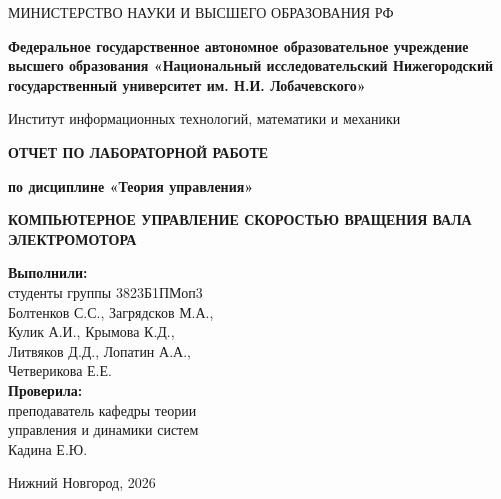 \documentclass[12pt,a4paper]{extarticle}
\begin{document}
\begin{titlepage}
    \begin{center}
        \small
        МИНИСТЕРСТВО НАУКИ И ВЫСШЕГО ОБРАЗОВАНИЯ РФ
        \vspace{0.3cm}
        
        \textbf{Федеральное государственное автономное образовательное учреждение высшего образования «Национальный исследовательский
        Нижегородский государственный университет им. Н.И. Лобачевского»}
        \vspace{0.3cm}
        
        Институт информационных технологий, математики и механики
        \vspace{2cm}
        
        \large\textbf{ОТЧЕТ ПО ЛАБОРАТОРНОЙ РАБОТЕ}
        \vspace{0.3cm}
        
        \large\textbf{по дисциплине «Теория управления»}
        \vspace{1cm}
        
        \large\textbf{КОМПЬЮТЕРНОЕ УПРАВЛЕНИЕ СКОРОСТЬЮ ВРАЩЕНИЯ ВАЛА ЭЛЕКТРОМОТОРА}
        \vspace{2cm}
    \end{center}
    
    \begin{flushright}
        \hspace*{3cm}
        \begin{minipage}{0.45\textwidth}
            \textbf{Выполнили:}\\
            студенты группы 3823Б1ПМоп3\\
            Болтенков С.С., Загрядсков М.А.,\\
            Кулик А.И., Крымова К.Д.,\\
            Литвяков Д.Д., Лопатин А.А.,\\
            Четверикова Е.Е.\\[0.5cm]
            \textbf{Проверила:}\\
            преподаватель кафедры теории\\
            управления и динамики систем\\
            Кадина Е.Ю.\\[0.3cm]
            \underline{\hspace{5cm}}
        \end{minipage}
    \end{flushright}
    
    \vfill
    \begin{center}
        Нижний Новгород, 2026
    \end{center}
\end{titlepage}
\end{document}
